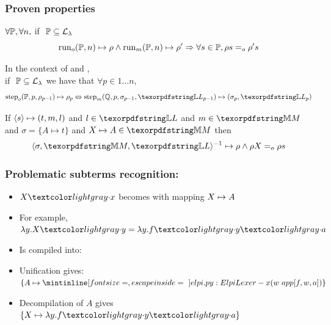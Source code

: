 \documentclass{pres}
\newtheorem{proposition}[theorem]{Proposition}
\begin{document}
\begin{frame}
  \frametitle{Proven properties}

  \begin{description}[]
    \item[Run Equivalence]
    $\forall \foUnifPb, \forall n,$ if $~\foUnifPb \subseteq \llambda$
    $$
      \runFx{\foUnifPb}{n}{\rho} \land
      \runHx{\foUnifPb}{n}{\rho'}
      \Rightarrow
      \forall s \in \foUnifPb, \rho s \Eo \rho' s
    $$
    \item [Simulation fidelity]
    In the context of  \frun and \hrun,\\
    if $~\foUnifPb \subseteq \llambda$ we have that
    $\forall p \in 1 \ldots n,$
    $$\stepF{\foUnifPb}{p}{\rho_{p-1}}{\rho_p}
    \Leftrightarrow
    \stepH{\hoUnifPb}{p}{\sigma_{p-1}}{\linkStore_{p-1}}{\sigma_p}{\linkStore_p}
    $$
    \item[Compilation round trip]
      If $\C{s}{t}{m}{l}$ and $l \in \linkStore$ and $m \in \mapStore$
      and
      $\sigma = \{ A \mapsto t\}$ and $\mapping{X}{A}{n} \in \mapStore$
      then 
      $$\D{\sigma}{\mapStore}{\linkStore}{\rho} \land \rho X \Eo \rho s$$
  \end{description}

\end{frame}

\begin{frame}
  \frametitle{Problematic subterms recognition: \maybebeta}

  \begin{itemize}
    \item $X\appsep x$ becomes  with mapping $\mapping{X}{A}{1}$
    \item For example, $\lambda y. X\appsep y = \lambda y. f\appsep y\appsep a$
    \item Is compiled into: 
    \item Unification gives: $\{A \mapsto \elpiIn{(w\ app[f, w, a])}\}$
    \item Decompilation of $A$ gives $\{X \mapsto \lambda y.f\appsep y\appsep a\}$
  \end{itemize}

\end{frame}
\end{document}
